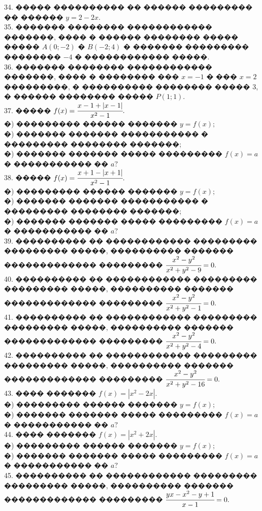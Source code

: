 \documentclass[12pt]{article}
\begin{document}
34. ����� ���������� �� ������ ��������� �� ������ $y=2-2x.$\\
35. ������� �������� ������������ �������, ���� � ������ �������� ����� ����� $A(0;-2)$ � $B(-2;4)$ � ������� ��������� �������� $-4$ � ������������ �����.\\
36. ������� �������� ������������ �������, ���� � �������� ��� $x=-1$ � ��� $x=2$ ���������, � ���������� �������� ����� 3, � ������ �������� ����� $P(1;1).$\\
37. ����� $f(x)=\cfrac{x-1+|x-1|}{x^2-1}.$\\
�) ��������� ������ ������� $y=f(x);$\\
�) ������� ������� ����������� � ��������� �������� �������;\\
�) ������� ������� ����� ��������� $f(x)=a$ � ����������� �� $a?$\\
38. ����� $f(x)=\cfrac{x+1-|x+1|}{x^2-1}.$\\
�) ��������� ������ ������� $y=f(x);$\\
�) ������� ������� ����������� � ��������� �������� �������;\\
�) ������� ������� ����� ��������� $f(x)=a$ � ����������� �� $a?$\\
39. ���������� �� ������������ ��������� ��������� �����, ���������� ������� ������������� ��������� $\cfrac{x^2-y^2}{x^2+y^2-9}=0.$\\
40. ���������� �� ������������ ��������� ��������� �����, ���������� ������� ������������� ��������� $\cfrac{x^2-y^2}{x^2+y^2-1}=0.$\\
41. ���������� �� ������������ ��������� ��������� �����, ���������� ������� ������������� ��������� $\cfrac{x^2-y^2}{x^2+y^2-4}=0.$\\
42. ���������� �� ������������ ��������� ��������� �����, ���������� ������� ������������� ��������� $\cfrac{x^2-y^2}{x^2+y^2-16}=0.$\\
43. ���� ������� $f(x)=|x^2-2x|.$\\
�) ��������� ������ ������� $y=f(x);$\\
�) ������� ������� ����� ��������� $f(x)=a$ � ����������� �� $a?$\\
44. ���� ������� $f(x)=|x^2+2x|.$\\
�) ��������� ������ ������� $y=f(x);$\\
�) ������� ������� ����� ��������� $f(x)=a$ � ����������� �� $a?$\\
45. ���������� �� ������������ ��������� ��������� �����, ���������� ������� ������������� ��������� $\cfrac{yx-x^2-y+1}{x-1}=0.$\\
\end{document}
